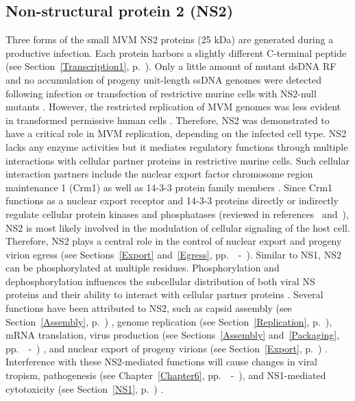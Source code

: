 \subsection{Non-structural protein 2 (NS2)}
Three forms of the small MVM NS2 proteins (25 kDa) are generated during a productive infection. Each protein harbors a slightly different C-terminal peptide (see Section~\ref{Transcription1}, p.~\pageref{Transcription1}). Only a little amount of mutant dsDNA RF and no accumulation of progeny unit-length ssDNA genomes were detected following infection or transfection of restrictive murine cells with NS2-null mutants \cite{pmid1385828}. However, the restricted replication of MVM genomes was less evident in transformed permissive human cells \cite{pmid2147041}. Therefore, NS2 was demonstrated to have a critical role in MVM replication, depending on the infected cell type. NS2 lacks any enzyme activities but it mediates regulatory functions through multiple interactions with cellular partner proteins in restrictive murine cells. Such cellular interaction partners include the nuclear export factor chromosome region maintenance 1 (Crm1) as well as 14-3-3 protein family members \cite{pmid10438867, pmid10527855, pmid8892871}. Since Crm1 functions as a nuclear export receptor and 14-3-3 proteins directly or indirectly regulate cellular protein kinases and phosphatases (reviewed in references \cite{pmid7709434}~and~\cite{pmid7743183}), NS2 is most likely involved in the modulation of cellular signaling of the host cell. Therefore, NS2 plays a central role in the control of nuclear export and progeny virion egress (see Sections~\ref{Export} and~\ref{Egress}, pp.~\pageref{Export}~-~\pageref{Egress1}). Similar to NS1, NS2 can be phosphorylated at multiple residues. Phosphorylation and dephosphorylation influences the subcellular distribution of both viral NS proteins \cite{pmid2142555} and their ability to interact with cellular partner proteins \cite{pmid10438867}. Several functions have been attributed to NS2, such as capsid assembly (see Section~\ref{Assembly}, p.~\pageref{Assembly}) \cite{pmid9168889}, genome replication (see Section~\ref{Replication}, p.~\pageref{Replication}), mRNA translation, virus production (see Sections~\ref{Assembly} and~\ref{Packaging}, pp.~\pageref{Assembly}~-~\pageref{Packaging1}) \cite{pmid2147041, pmid8419637}, and nuclear export of progeny virions (see Section~\ref{Export}, p.~\pageref{Export}) \cite{pmid11884550, pmid10527855, pmid12239307, pmid10438867}. Interference with these NS2-mediated functions will cause changes in viral tropism, pathogenesis (see Chapter~\ref{Chapter6}, pp.~\pageref{Chapter6}~-~\pageref{Chaper6end}), and NS1-mediated cytotoxicity (see Section~\ref{NS1}, p.~\pageref{NS1}) \cite{pmid2137660, pmid1373202, pmid9519837, pmid16039688, pmid8317090}.                 



